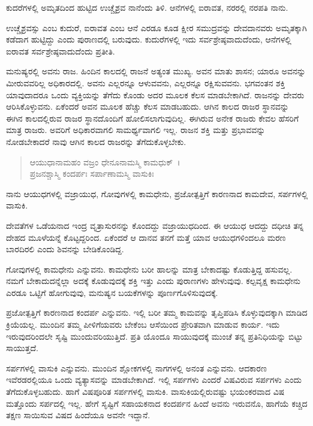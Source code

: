 {\small ಕುದರೆಗಳಲ್ಲಿ ಅಮೃತದಿಂದ ಹುಟ್ಟಿದ ಉಚ್ಚೈಶ್ರವ ನಾನೆಂದು ತಿಳಿ. ಆನೆಗಳಲ್ಲಿ ಐರಾವತ, ನರರಲ್ಲಿ ನರಪತಿ ನಾನು.}

ಉಚ್ಚೈಶ್ರವಸ್ಸು ಎಂಬ ಕುದುರೆ, ಐರಾವತ ಎಂಬ ಆನೆ ಎರಡೂ ಕೂಡ ಕ್ಷೀರ ಸಮುದ್ರವನ್ನು ದೇವದಾನವರು ಅಮೃತಕ್ಕಾಗಿ ಕಡೆದಾಗ ಹುಟ್ಟಿದ್ದು ಎಂದು ಪುರಾಣದಲ್ಲಿ ಬರುವುದು. ಕುದುರೆಗಳಲ್ಲಿ ಇದು ಸರ್ವಶ್ರೇಷ್ಠವಾದುದೆಂದು, ಆನೆಗಳಲ್ಲಿ ಐರಾವತ ಸರ್ವಶ್ರೇಷ್ಠವಾದುದೆಂದು ಪ್ರತೀತಿ.

ಮನುಷ್ಯರಲ್ಲಿ ಅವನು ರಾಜ. ಹಿಂದಿನ ಕಾಲದಲ್ಲಿ ರಾಜನೆ ಅತ್ಯಂತ ಮುಖ್ಯ. ಅವನ ಮಾತು ಶಾಸನ; ಯಾರೂ ಅವನನ್ನು ಮೀರುವವರಿಲ್ಲ ಅಧಿಕಾರದಲ್ಲಿ. ಅವನು ಎಲ್ಲರನ್ನೂ ಆಳುವವನು, ಎಲ್ಲರನ್ನೂ ರಕ್ಷಿಸುವವನು. ಭಗವಂತನ ಶಕ್ತಿ ಯಾವುದಾದರೂ ಒಂದು ವ್ಯಕ್ತಿಯನ್ನು ತೆಗೆದು ಕೊಂಡು ಅದರ ಮೂಲಕ ಕೆಲಸ ಮಾಡಬೇಕಾಗಿದೆ. ರಾಜನನ್ನು ದೇವರು ಆರಿಸಿಕೊಳ್ಳುವನು. ಏಕೆಂದರೆ ಅವನ ಮೂಲಕ ಹೆಚ್ಚು ಕೆಲಸ ಮಾಡಬಹುದು. ಆಗಿನ ಕಾಲದ ರಾಜರ ಸ್ಥಾನವನ್ನು ಈಗಿನ ಕಾಲದಲ್ಲಿರುವ ರಾಜರ ಸ್ಥಾನದೊಂದಿಗೆ ಹೋಲಿಸಲಾಗುವುದಿಲ್ಲ. ಈಗಿರುವ ಅನೇಕ ರಾಜರು ಕೇವಲ ಹೆಸರಿಗೆ ಮಾತ್ರ ರಾಜರು. ಅವರಿಗೆ ಅಧಿಕಾರವಾಗಲಿ ಸಾಮರ್ಥ್ಯವಾಗಲಿ ಇಲ್ಲ. ರಾಜನ ಶಕ್ತಿ ಮತ್ತು ಪ್ರಭಾವವನ್ನು ನೋಡಬೇಕಾದರೆ ನಾವು ಆಗಿನ ಕಾಲದ ರಾಜರನ್ನು ತೆಗೆದುಕೊಳ್ಳಬೇಕು.

\begin{verse}
ಆಯುಧಾನಾಮಹಂ ವಜ್ರಂ ಧೇನೂನಾಮಸ್ಮಿ ಕಾಮಧುಕ್~।\\ಪ್ರಜನಶ್ಚಾಸ್ಮಿ ಕಂದರ್ಪಃ ಸರ್ಪಾಣಾಮಸ್ಮಿ ವಾಸುಕಿಃ 
\end{verse}

{\small ನಾನು ಆಯುಧಗಳಲ್ಲಿ ವಜ್ರಾಯುಧ, ಗೋವುಗಳಲ್ಲಿ ಕಾಮಧೇನು, ಪ್ರಜೋತ್ಪತ್ತಿಗೆ ಕಾರಣನಾದ ಕಾಮದೇವ, ಸರ್ಪಗಳಲ್ಲಿ ವಾಸುಕಿ.}

ದೇವತೆಗಳ ಒಡೆಯನಾದ ಇಂದ್ರ ವೃತ್ರಾಸುರನನ್ನು ಕೊಂದದ್ದು ವಜ್ರಾಯುಧದಿಂದ. ಈ ಆಯುಧ ಆದದ್ದು ದಧೀಚಿ ತನ್ನ ದೇಹದ ಮೂಳೆಯನ್ನೆ ಕೊಟ್ಟದ್ದರಿಂದ. ಏಕೆಂದರೆ ಆ ದಾನವ ತನಗೆ ಮತ್ತೆ ಯಾವ ಆಯುಧಗಳಿಂದಲೂ ಮರಣ ಬಾರದಿರಲಿ ಎಂದು ಶಿವನನ್ನು ಬೇಡಿಕೊಂಡಿದ್ದ.

ಗೋವುಗಳಲ್ಲಿ ಕಾಮಧೇನು ಎನ್ನುವನು. ಕಾಮಧೇನು ಬರೀ ಹಾಲನ್ನು ಮಾತ್ರ ಬೇಕಾದಷ್ಟು ಕೊಡುತ್ತಿದ್ದ ಹಸುವಲ್ಲ. ನಮಗೆ ಬೇಕಾದುದನ್ನೆಲ್ಲಾ ಅದಕ್ಕೆ ಕೊಡುವುದಕ್ಕೆ ಶಕ್ತಿ ಇತ್ತು ಎಂದು ಪುರಾಣಗಳು ಹೇಳುವುವು. ಕಲ್ಪವೃಕ್ಷ ಕಾಮಧೇನು ಎರಡೂ ಒಟ್ಟಿಗೆ ಹೋಗುವುವು, ಮನುಷ್ಯನ ಬಯಕೆಗಳನ್ನು ಪೂರ್ಣಗೊಳಿಸುವುದಕ್ಕೆ.

ಪ್ರಜೋತ್ಪತ್ತಿಗೆ ಕಾರಣನಾದ ಕಂದರ್ಪ ಎನ್ನುವನು. ಇಲ್ಲಿ ಬರೀ ತಮ್ಮ ಕಾಮವನ್ನು ತೃಪ್ತಿಪಡಿಸಿ ಕೊಳ್ಳುವುದಕ್ಕಾಗಿ ಮಾಡಿದ ಕ್ರಿಯೆಯಲ್ಲ. ಮುಂದಿನ ತಮ್ಮ ಪೀಳಿಗೆಯವರು ಬೇಕೆಂಬ ಆಸೆಯಿಂದ ಪ್ರೇರಿತವಾಗಿ ಮಾಡುವ ಕಾರ್ಯ. ಇದು ಇರುವುದರಿಂದಲೇ ಸೃಷ್ಟಿ ಮುಂದುವರಿಯುತ್ತಿದೆ. ಪ್ರತಿ ಯೊಂದೂ ಸಾಯುವುದಕ್ಕೆ ಮುಂಚೆ ತನ್ನ ಪ್ರತಿನಿಧಿಯನ್ನು ಬಿಟ್ಟು ಸಾಯುತ್ತದೆ.

ಸರ್ಪಗಳಲ್ಲಿ ವಾಸುಕಿ ಎನ್ನುವನು. ಮುಂದಿನ ಶ್ಲೋಕಗಳಲ್ಲಿ ನಾಗಗಳಲ್ಲಿ ಅನಂತ ಎನ್ನುವನು. ಆದಕಾರಣ ಇವೆರಡರಲ್ಲಿಯೂ ಒಂದು ವ್ಯತ್ಯಾಸವನ್ನು ಮಾಡಬೇಕಾಗಿದೆ. ಇಲ್ಲಿ ಸರ್ಪಗಳು ಎಂದರೆ ವಿಷವಿರುವ ಸರ್ಪಗಳು ಎಂದು ತೆಗೆದುಕೊಳ್ಳಬಹುದು. ಹಾಗೆ ವಿಷಪೂರಿತ ಸರ್ಪಗಳಲ್ಲಿ ವಾಸುಕಿ. ವಾಸುಕಿಯಲ್ಲಿರುವಷ್ಟು ಭಯಂಕರವಾದ ವಿಷ ಮತ್ತೊಂದು ಸರ್ಪದಲ್ಲಿ ಇಲ್ಲ. ಹೇಗೆ ಸೃಷ್ಟಿಗೆ ಸಹಾಯಕನಾದ ಕಂದರ್ಪನ ಹಿಂದೆ ಅವನು ಇರುವನೊ, ಹಾಗೆಯೆ ಕಚ್ಚಿದ ತಕ್ಷಣ ಸಾಯಿಸುವ ವಿಷದ ಹಿಂದೆಯೂ ಅವನೇ ಇದ್ದಾನೆ.

